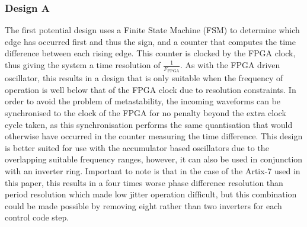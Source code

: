 \documentclass[conference]{IEEEtran}
\begin{document}
\subsubsection*{Design A}
The first potential design uses a Finite State Machine (FSM) to determine which edge has occurred first and thus the sign, and a counter that computes the time difference between each rising edge. This counter is clocked by the FPGA clock, thus giving the system a time resolution of $\frac{1}{F_{\textrm{FPGA}}}$. As with the FPGA driven oscillator, this results in a design that is only suitable when the frequency of operation is well below that of the FPGA clock due to resolution constraints. In order to avoid the problem of metastability, the incoming waveforms can be synchronised to the clock of the FPGA for no penalty beyond the extra clock cycle taken, as this synchronisation performs the same quantisation that would otherwise have occurred in the counter measuring the time difference. This design is better suited for use with the accumulator based oscillators due to the overlapping suitable frequency ranges, however, it can also be used in conjunction with an inverter ring. Important to note is that in the case of the Artix-7 used in this paper, this results in a four times worse phase difference resolution than period resolution which made low jitter operation difficult, but this combination could be made possible by removing eight rather than two inverters for each control code step. %
\end{document}
